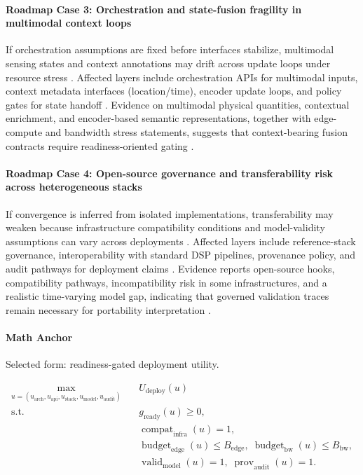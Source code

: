 \paragraph{Roadmap Case 3: Orchestration and state-fusion fragility in multimodal context loops}
If orchestration assumptions are fixed before interfaces stabilize, multimodal sensing states and context annotations may drift across update loops under resource stress \cite{O_ISAC_151}. Affected layers include orchestration APIs for multimodal inputs, context metadata interfaces (location/time), encoder update loops, and policy gates for state handoff \cite{O_ISAC_151}. Evidence on multimodal physical quantities, contextual enrichment, and encoder-based semantic representations, together with edge-compute and bandwidth stress statements, suggests that context-bearing fusion contracts require readiness-oriented gating \cite{O_ISAC_151}.

\paragraph{Roadmap Case 4: Open-source governance and transferability risk across heterogeneous stacks}
If convergence is inferred from isolated implementations, transferability may weaken because infrastructure compatibility conditions and model-validity assumptions can vary across deployments \cite{O_ISAC_200}. Affected layers include reference-stack governance, interoperability with standard DSP pipelines, provenance policy, and audit pathways for deployment claims \cite{O_ISAC_200}. Evidence reports open-source hooks, compatibility pathways, incompatibility risk in some infrastructures, and a realistic time-varying model gap, indicating that governed validation traces remain necessary for portability interpretation \cite{O_ISAC_200}.

\paragraph{Math Anchor}
Selected form: readiness-gated deployment utility.

\[
\begin{aligned}
\max_{u=(u_{\mathrm{arch}},u_{\mathrm{api}},u_{\mathrm{stack}},u_{\mathrm{model}},u_{\mathrm{audit}})} \quad & U_{\mathrm{deploy}}(u) \\
\text{s.t.} \quad & g_{\mathrm{ready}}(u) \ge 0, \\
& \operatorname{compat}_{\mathrm{infra}}(u)=1, \\
& \operatorname{budget}_{\mathrm{edge}}(u) \le B_{\mathrm{edge}},\; \operatorname{budget}_{\mathrm{bw}}(u) \le B_{\mathrm{bw}}, \\
& \operatorname{valid}_{\mathrm{model}}(u)=1,\; \operatorname{prov}_{\mathrm{audit}}(u)=1.
\end{aligned}
\]

